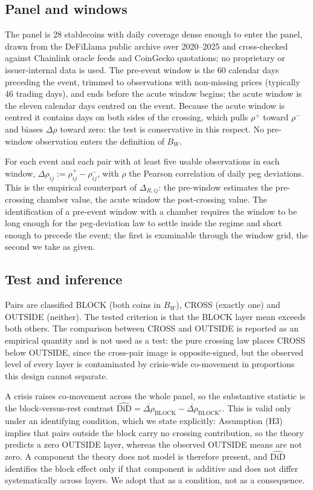 \subsection*{Panel and windows}
The panel is 28 stablecoins with daily coverage dense enough to enter the panel, drawn from the DeFiLlama public archive over 2020--2025 and cross-checked against Chainlink oracle feeds and CoinGecko quotations; no proprietary or issuer-internal data is used. The pre-event window is the 60 calendar days preceding the event, trimmed to observations with non-missing prices (typically 46 trading days), and ends before the acute window begins; the acute window is the eleven calendar days centred on the event. Because the acute window is centred it contains days on both sides of the crossing, which pulls $\rho^{+}$ toward $\rho^{-}$ and biases $\Delta\rho$ toward zero: the test is conservative in this respect. No pre-window observation enters the definition of $B_W$.

For each event and each pair with at least five usable observations in each window, $\Delta\rho_{ij}:=\rho^{+}_{ij}-\rho^{-}_{ij}$, with $\rho$ the Pearson correlation of daily peg deviations. This is the empirical counterpart of $\Delta_{R,ij}$: the pre-window estimates the pre-crossing chamber value, the acute window the post-crossing value. The identification of a pre-event window with a chamber requires the window to be long enough for the peg-deviation law to settle inside the regime and short enough to precede the event; the first is examinable through the window grid, the second we take as given.

\subsection*{Test and inference}
Pairs are classified BLOCK (both coins in $B_W$), CROSS (exactly one) and OUTSIDE (neither). The tested criterion is that the BLOCK layer mean exceeds both others. The comparison between CROSS and OUTSIDE is reported as an empirical quantity and is not used as a test: the pure crossing law places CROSS below OUTSIDE, since the cross-pair image is opposite-signed, but the observed level of every layer is contaminated by crisis-wide co-movement in proportions this design cannot separate.

A crisis raises co-movement across the whole panel, so the substantive statistic is the block-versus-rest contrast $\widehat{\mathrm{DiD}}=\overline{\Delta\rho}_{\mathrm{BLOCK}}-\overline{\Delta\rho}_{\mathrm{BLOCK}^{c}}$. This is valid only under an identifying condition, which we state explicitly: Assumption (H3) implies that pairs outside the block carry no crossing contribution, so the theory predicts a zero OUTSIDE layer, whereas the observed OUTSIDE means are not zero. A component the theory does not model is therefore present, and $\widehat{\mathrm{DiD}}$ identifies the block effect only if that component is additive and does not differ systematically across layers. We adopt that as a condition, not as a consequence.

